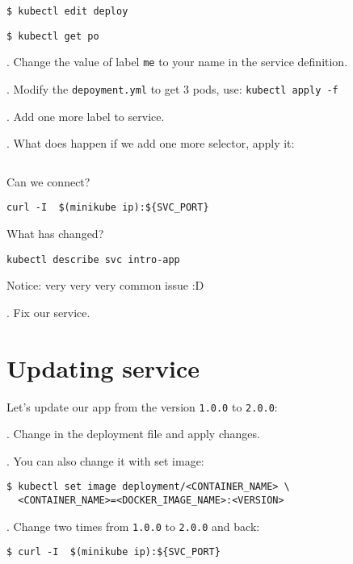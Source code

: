\documentclass[12pt, letterpaper]{article}
\begin{document}
\begin{verbatim}
$ kubectl edit deploy
\end{verbatim}

\begin{verbatim}
$ kubectl get po
\end{verbatim}

. Change the value of label \verb|me| to your name in the service definition.

. Modify the \verb|depoyment.yml| to get 3 pods, use: \texttt{kubectl apply -f}

. Add one more label to service.

. What does happen if we add one more selector, apply it:

\inputminted{yaml}{introduction/exercise-broke-svc/kube-service-broke.yml}


Can we connect?

\begin{verbatim}
curl -I  $(minikube ip):${SVC_PORT}
\end{verbatim}

What has changed?
\begin{verbatim}
kubectl describe svc intro-app
\end{verbatim}

\bigskip
Notice: {\large very very very common issue} :D

. Fix our service.

%
%
%
\section{Updating service}

Let's update our app from the version \verb|1.0.0| to \verb|2.0.0|:

. Change in the deployment file and apply changes.

. You can also change it with set image:

\begin{verbatim}
$ kubectl set image deployment/<CONTAINER_NAME> \
  <CONTAINER_NAME>=<DOCKER_IMAGE_NAME>:<VERSION>
\end{verbatim}

. Change two times from \verb|1.0.0| to \verb|2.0.0| and back:

\begin{verbatim}
$ curl -I  $(minikube ip):${SVC_PORT}
\end{verbatim}
\end{document}
